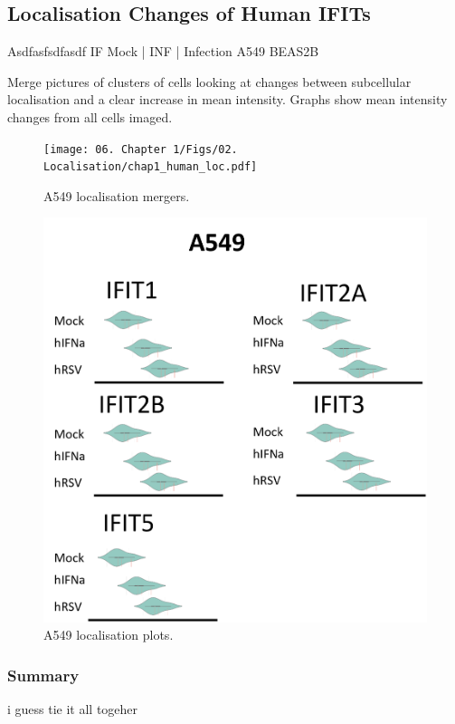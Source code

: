 \subsection{Localisation Changes of Human IFITs} \label{Localisation Changes of Human IFITs}
Asdfasfsdfasdf \newline
IF Mock | INF | Infection \newline
A549 BEAS2B

Merge pictures of clusters of cells looking at changes between subcellular localisation and a clear increase in mean intensity. Graphs show mean intensity changes from all cells imaged.

\begin{figure}
    \centering
    \texttt{[image: 06. Chapter 1/Figs/02. Localisation/chap1\_human\_loc.pdf]}
    \caption[A549 localisation mergers.]{A549 localisation mergers.}
    \label{A549 localisation mergers.}
\end{figure}


\begin{figure}
    \centering
    \includegraphics[width=1\linewidth]{06. Chapter 1/Figs/02. Localisation/02. a549 plots.png}
    \caption[A549 localisation plots.]{A549 localisation plots.}
    \label{A549 localisation plots.}
\end{figure}

\subsubsection*{Summary} \label{Summary-human-localisation}
i guess tie it all togeher
